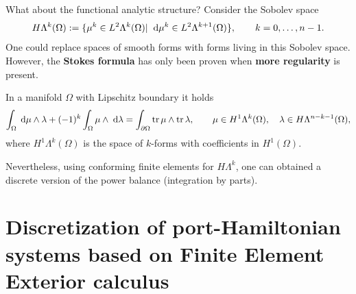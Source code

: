 \documentclass[aspectratio=169]{beamer}
\DeclareMathOperator{\tr}{tr}
\begin{document}
\begin{frame}{What about the functional analytic structure?}
Consider the Sobolev space
\begin{equation*}
	H\Lambda^k(\Omega) := \{\mu^k \in L^2 \Lambda^k(\Omega) \vert \; \d{\mu^k} \in L^2 \Lambda^{k+1}(\Omega)\}, \qquad k=0, \dots, n-1.
\end{equation*}
One could replace spaces of smooth forms with forms living in this Sobolev space. \\
However, the \textbf{Stokes formula} has only been proven when \textbf{more regularity} is present.
\begin{theorem}
	In a manifold $\Omega$ with Lipschitz boundary it holds
	\begin{equation*}
		\int_\Omega \d{\mu} \wedge \lambda + (-1)^k \int_\Omega \mu \wedge \d{\lambda} = \int_{\partial \Omega}\tr {\mu} \wedge \tr{\lambda}, \qquad \mu \in H^1\Lambda^{k}(\Omega), \quad \lambda \in H \Lambda^{n-k-1}(\Omega),
	\end{equation*}
	where $H^1\Lambda^k(\Omega)$ is the space of $k$-forms with coefficients in $H^1(\Omega)$.
\end{theorem}

Nevertheless, using conforming finite elements for $H\Lambda^k$, one can obtained a discrete version of the power balance (integration by parts).

\end{frame}

\section{Discretization of port-Hamiltonian systems based on Finite Element Exterior calculus}
\end{document}
